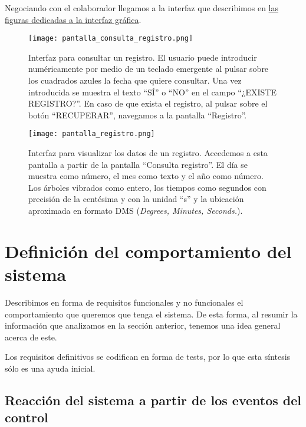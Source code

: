 Negociando con el colaborador llegamos a la interfaz que describimos
en \hyperref[fig:interfaz_gráfica]{las figuras dedicadas a la interfaz
gráfica}.

\begin{figure}[!b]
    \begin{minipage}[b]{0.48\textwidth}
        \texttt{[image: pantalla\_consulta\_registro.png]}
        \caption{Interfaz para consultar un registro. El usuario puede
        introducir numéricamente por medio de un teclado emergente al pulsar
        sobre los cuadrados azules la fecha que quiere consultar. Una vez
        introducida se muestra el texto ``SÍ'' o ``NO'' en el campo ``¿EXISTE REGISTRO?''.
        En caso de que exista el registro, al pulsar sobre el botón ``RECUPERAR'',
        navegamos a la pantalla ``Registro''.}
    \end{minipage}
    \hfill
    \begin{minipage}[b]{0.48\textwidth}
        \texttt{[image: pantalla\_registro.png]}
        \caption{Interfaz para visualizar los datos de un registro. Accedemos
        a esta pantalla a partir de la pantalla ``Consulta registro''. El día
        se muestra como número, el mes como texto y el año como número.
        Los árboles vibrados como entero, los tiempos como segundos con 
        precisión de la centésima y con la unidad ``s'' y la ubicación
        aproximada en formato DMS (\textit{\textit{Degrees, Minutes, Seconds.}}).}
    \end{minipage}
    \label{fig:interfaz_gráfica}
\end{figure}

\section{Definición del comportamiento del sistema}

Describimos en forma de requisitos funcionales y no funcionales el
comportamiento que queremos que tenga el sistema. De esta forma, al resumir
la información que analizamos en la sección anterior, tenemos una
idea general acerca de este.

Los requisitos definitivos se codifican en forma de tests, por lo que
esta síntesis sólo es una ayuda inicial.

\subsection{Reacción del sistema a partir de los eventos del control}

